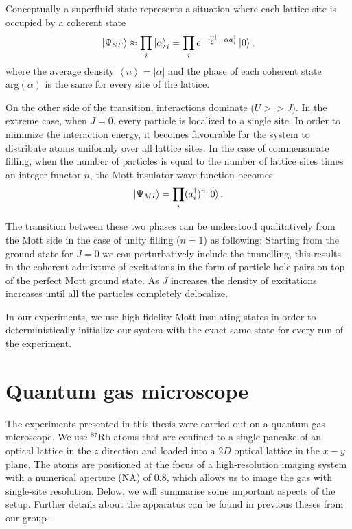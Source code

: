 Conceptually a superfluid state represents a situation where each lattice site is occupied by a coherent state
\begin{equation}
\left|\Psi_{SF}\right\rangle \approx\prod_i \left|\alpha\right\rangle_i=\prod_i e^{-\frac{\left| \alpha \right|}{2}-\alpha a^\dagger_i}\left|0\right\rangle,
\end{equation}
where the average density $\left<n\right> = \left| \alpha \right|$ and the phase of each coherent state $\textrm{arg}(\alpha)$ is the same for every site of the lattice.

On the other side of the transition, interactions dominate ($U>>J$). In the extreme case, when $J=0$, every particle is localized to a single site. In order to minimize the interaction energy, it becomes favourable for the system to distribute atoms uniformly over all lattice sites. In the case of commensurate filling, when the number of particles is equal to the number of lattice sites times an integer functor $n$, the Mott insulator wave function becomes:
\begin{equation}
\left|\Psi_{MI}\right\rangle =\prod_i (a_i^\dagger)^n\left|0\right\rangle.
\end{equation}

The transition between these two phases can be understood qualitatively from the Mott side in the case of unity filling ($n=1$) as following: Starting from the ground state for $J=0$ we can perturbatively include the tunnelling, this results in the coherent admixture of excitations in the form of particle-hole pairs on top of the perfect Mott ground state. As $J$ increases the density of excitations increases until all the particles completely delocalize. 

In our experiments, we use high fidelity Mott-insulating states in order to deterministically initialize our system with the exact same state for every run of the experiment.

\section{Quantum gas microscope}
The experiments presented in this thesis were carried out on a quantum gas microscope. We use $^{87}\textrm{Rb}$ atoms that are confined to a single pancake of an optical lattice in the $z$ direction and loaded into a $2D$ optical lattice in the $x-y$ plane. The atoms are positioned at the focus of a high-resolution imaging system with a numerical aperture (NA) of $0.8$, which allows us to image the gas with single-site resolution. Below, we will summarise some important aspects of the setup. Further details about the apparatus can be found in previous theses from our group \cite{PengThesis, GillenThesis, BakrThesis}.

